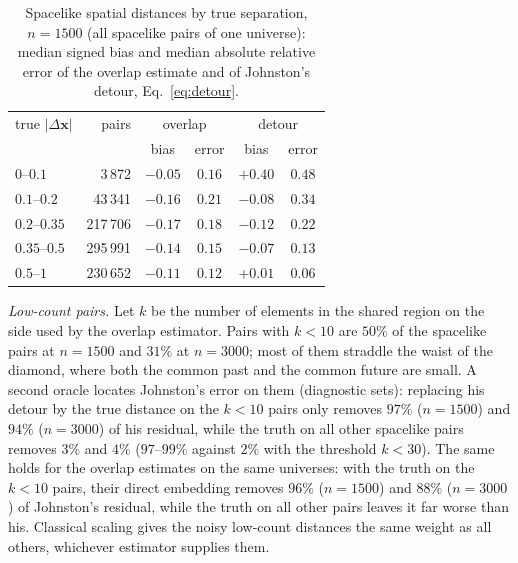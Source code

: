 \documentclass[prd,twocolumn,superscriptaddress,nofootinbib,amsmath,amssymb,floatfix]{revtex4-2}
\begin{document}
\begin{table}[t]
\caption{Spacelike spatial distances by true separation, $n=1500$ (all spacelike pairs of one universe): median signed bias and median absolute relative error of the overlap estimate and of Johnston's detour, Eq.~\eqref{eq:detour}.}
\label{tab:profile}
\begin{ruledtabular}
\begin{tabular}{lrcccc}
true $|\Delta\mathbf x|$ & pairs & \multicolumn{2}{c}{overlap} & \multicolumn{2}{c}{detour}\\
 & & bias & error & bias & error\\
\hline
$0$--$0.1$ & 3\,872 & $-0.05$ & $0.16$ & $+0.40$ & $0.48$\\
$0.1$--$0.2$ & 43\,341 & $-0.16$ & $0.21$ & $-0.08$ & $0.34$\\
$0.2$--$0.35$ & 217\,706 & $-0.17$ & $0.18$ & $-0.12$ & $0.22$\\
$0.35$--$0.5$ & 295\,991 & $-0.14$ & $0.15$ & $-0.07$ & $0.13$\\
$0.5$--$1$ & 230\,652 & $-0.11$ & $0.12$ & $+0.01$ & $0.06$\\
\end{tabular}
\end{ruledtabular}
\end{table}

\emph{Low-count pairs.} Let $k$ be the number of elements in the shared region on the side used by the overlap estimator. Pairs with $k<10$ are $50\%$ of the spacelike pairs at $n=1500$ and $31\%$ at $n=3000$; most of them straddle the waist of the diamond, where both the common past and the common future are small. A second oracle locates Johnston's error on them (diagnostic sets): replacing his detour by the true distance on the $k<10$ pairs only removes $97\%$ ($n=1500$) and $94\%$ ($n=3000$) of his residual, while the truth on all other spacelike pairs removes $3\%$ and $4\%$ ($97$--$99\%$ against $2\%$ with the threshold $k<30$). The same holds for the overlap estimates on the same universes: with the truth on the $k<10$ pairs, their direct embedding removes $96\%$ ($n=1500$) and $88\%$ ($n=3000$) of Johnston's residual, while the truth on all other pairs leaves it far worse than his. Classical scaling gives the noisy low-count distances the same weight as all others, whichever estimator supplies them.
\end{document}
